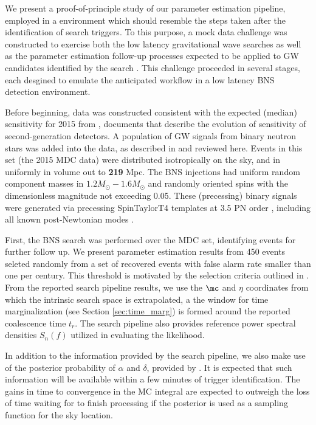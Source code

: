 \label{sec:Results}

We present a proof-of-principle study of our parameter estimation pipeline, employed in a environment which should
resemble the steps taken after the identification of search triggers. To this purpose, a mock data challenge was
constructed to exercise both the low latency gravitational wave searches as well as the parameter estimation follow-up
processes expected to be applied to GW candidates identified by the search \cite{first2years}. This challenge proceeded
in several stages, each desgined to emulate the anticipated workflow in a low latency BNS detection environment. 

Before beginning, data was constructed consistent with the expected  (median) sensitivity for  2015
from \cite{LIGO-Inspiral-Rates,LIGO-2013-WhitePaper-CoordinatedEMObserving}, documents that describe the evolution of
sensitivity of second-generation detectors.   A population of GW signals from binary neutron stars was added into the
data, as described in \cite{first2years} and reviewed here.   Events in this set (the 2015 MDC data) were distributed
isotropically on the sky, and in uniformly in volume out to \textbf{219} \unit{Mpc}. The BNS injections had uniform
random component masses in $1.2 M_\odot-1.6 M_\odot$ and randomly oriented spins with the dimensionless magnitude not
exceeding 0.05. 
These  (precessing) binary signals  were generated via precessing
SpinTaylorT4 templates at 3.5 PN order \cite{BCV:PTF}, including all known post-Newtonian modes \cite{gw-astro-mergers-approximations-SpinningPNHigherHarmonics}.  


First, the \gstlal{} BNS search was performed over the MDC set, identifying events for further follow up.  We present
parameter estimation results from 450 events seleted randomly from a set of recovered events with false alarm rate
smaller than one per century. This threshold is motivated by the selection criteria outlined
in \cite{LIGO-2013-WhitePaper-CoordinatedEMObserving}. From the reported  search pipeline results, we use the $\mc$ and
$\eta$ coordinates from which the intrinsic search space is extrapolated, a the window for time marginalization (see
Section \ref{sec:time_marg}) is formed around the reported coalescence time $t_r$.  The search pipeline also provides reference power spectral densities $S_n(f)$ utilized in evaluating the likelihood.

In addition to the information provided by the search pipeline, we also make use of the posterior probability of $\alpha$ and $\delta$, provided by \BS. It is expected that such information will be available within a few minutes of trigger identification. The gains in time to convergence in the MC integral are expected to outweigh the loss of time waiting for \BS{} to finish processing if the \BS{} posterior is used as a sampling function for the sky location.

